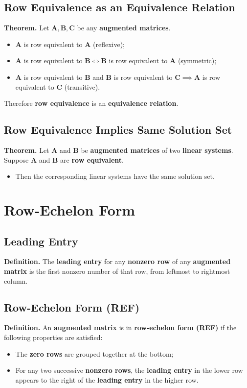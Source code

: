 \documentclass[../ma2001_notes.tex]{subfiles}
\begin{document}
\subsection{Row Equivalence as an Equivalence Relation}
\textbf{Theorem.} Let \(\bm{A}, \bm{B}, \bm{C}\) be any \textbf{augmented matrices}.
\begin{itemize}
	\item \(\bm{A}\) is row equivalent to \(\bm{A}\) (reflexive);
	\item \(\bm{A}\) is row equivalent to \(\bm{B}\iff\bm{B}\) is row equivalent to \(\bm{A}\) (symmetric);
	\item \(\bm{A}\) is row equivalent to \(\bm{B}\) and \(\bm{B}\) is row equivalent to \(\bm{C}\implies\bm{A}\) is row equivalent to \(\bm{C}\) (transitive).
\end{itemize}
Therefore \textbf{row equivalence} is an \textbf{equivalence relation}.

\subsection{Row Equivalence Implies Same Solution Set}
\textbf{Theorem.} Let \(\bm{A}\) and \(\bm{B}\) be \textbf{augmented matrices} of two \textbf{linear systems}. Suppose \(\bm{A}\) and \(\bm{B}\) are \textbf{row equivalent}.
\begin{itemize}
	\item Then the corresponding linear systems have the same solution set.
\end{itemize}

\section{Row-Echelon Form}
\subsection{Leading Entry}
\textbf{Definition.} The \textbf{leading entry} for any \textbf{nonzero row} of any \textbf{augmented matrix} is the first nonzero number of that row, from leftmost to rightmost column.

\subsection{Row-Echelon Form (REF)}
\textbf{Definition.} An \textbf{augmented matrix} is in \textbf{row-echelon form (REF)} if the following properties are satisfied:
\begin{itemize}
	\item The \textbf{zero rows} are grouped together at the bottom;
	\item For any two successive \textbf{nonzero rows}, the \textbf{leading entry} in the lower row appears to the right of the \textbf{leading entry} in the higher row.
\end{itemize}
\end{document}
